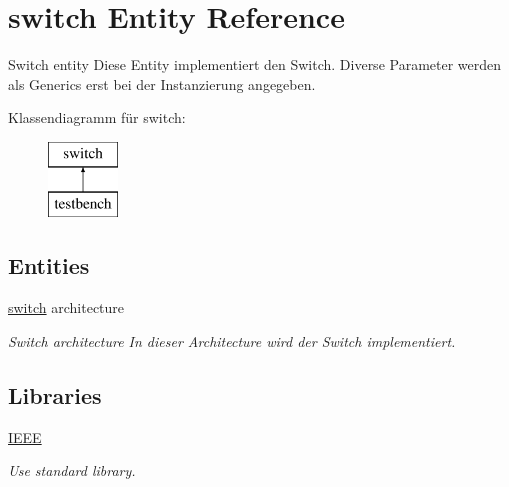 \hypertarget{classswitch}{}\section{switch Entity Reference}
\label{classswitch}


Switch entity Diese Entity implementiert den Switch. Diverse Parameter werden als Generics erst bei der Instanzierung angegeben.  


Klassendiagramm für switch\+:\begin{figure}[H]
\begin{center}
\leavevmode
\includegraphics[height=2.000000cm]{classswitch}
\end{center}
\end{figure}
\subsection*{Entities}
\begin{DoxyCompactItemize}
\item 
\mbox{\hyperlink{classswitch_1_1switch}{switch}} architecture
\begin{DoxyCompactList}\small\item\em Switch architecture In dieser Architecture wird der Switch implementiert. \end{DoxyCompactList}\end{DoxyCompactItemize}
\subsection*{Libraries}
 \begin{DoxyCompactItemize}
\item 
\mbox{\label{classswitch_ae4f03c286607f3181e16b9aa12d0c6d4}} 
\mbox{\hyperlink{classswitch_ae4f03c286607f3181e16b9aa12d0c6d4}{I\+E\+EE}} 
\begin{DoxyCompactList}\small\item\em Use standard library. \end{DoxyCompactList}\end{DoxyCompactItemize}
